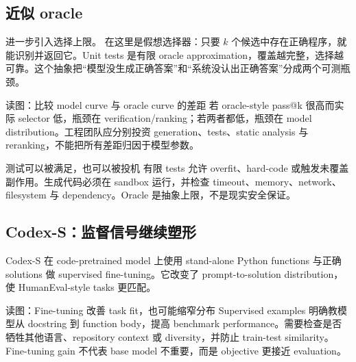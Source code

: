 
\subsection{近似 oracle}

进一步引入选择上限。 在这里是假想选择器：只要 $k$ 个候选中存在正确程序，就能识别并返回它。Unit tests 是有限 oracle approximation，覆盖越完整，选择越可靠。这个抽象把“模型没生成正确答案”和“系统没认出正确答案”分成两个可测瓶颈。


\begin{knowledgebox}{读图：比较 model curve 与 oracle curve 的差距}
若 oracle-style pass@k 很高而实际 selector 低，瓶颈在 verification/ranking；若两者都低，瓶颈在 model distribution。工程团队应分别投资 generation、tests、static analysis 与 reranking，不能把所有差距归因于模型参数。
\end{knowledgebox}

\begin{warningbox}{测试可以被满足，也可以被投机}
有限 tests 允许 overfit、hard-code 或触发未覆盖副作用。生成代码必须在 sandbox 运行，并检查 timeout、memory、network、filesystem 与 dependency。Oracle 是抽象上限，不是现实安全保证。
\end{warningbox}

\subsection{Codex-S：监督信号继续塑形}

Codex-S 在 code-pretrained model 上使用 stand-alone Python functions 与正确 solutions 做 supervised fine-tuning。它改变了 prompt-to-solution distribution，使 HumanEval-style tasks 更匹配。


\begin{knowledgebox}{读图：Fine-tuning 改善 task fit，也可能缩窄分布}
Supervised examples 明确教模型从 docstring 到 function body，提高 benchmark performance。需要检查是否牺牲其他语言、repository context 或 diversity，并防止 train-test similarity。Fine-tuning gain 不代表 base model 不重要，而是 objective 更接近 evaluation。
\end{knowledgebox}

